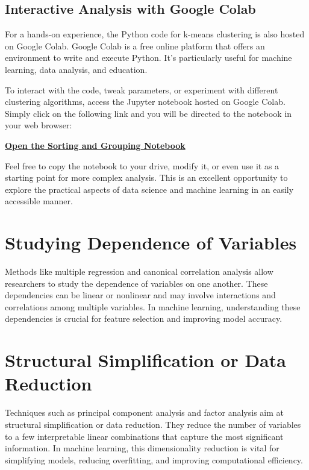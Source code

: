 \documentclass[a4paper,12pt]{book}
\begin{document}
\subsection{Interactive Analysis with Google Colab}
For a hands-on experience, the Python code for k-means clustering is also hosted on Google Colab. Google Colab is a free online platform that offers an environment to write and execute Python. It's particularly useful for machine learning, data analysis, and education.

To interact with the code, tweak parameters, or experiment with different clustering algorithms, access the Jupyter notebook hosted on Google Colab. Simply click on the following link and you will be directed to the notebook in your web browser:

\begin{center}
\href{https://colab.research.google.com/drive/1C4Rnja-fjwVB6GI5h1vYItJ5fbxDHlxh}{\textbf{Open the Sorting and Grouping Notebook}}
\end{center}

Feel free to copy the notebook to your drive, modify it, or even use it as a starting point for more complex analysis. This is an excellent opportunity to explore the practical aspects of data science and machine learning in an easily accessible manner.

\section{Studying Dependence of Variables}
Methods like multiple regression and canonical correlation analysis allow researchers to study the dependence of variables on one another. These dependencies can be linear or nonlinear and may involve interactions and correlations among multiple variables. In machine learning, understanding these dependencies is crucial for feature selection and improving model accuracy.

\section{Structural Simplification or Data Reduction}
Techniques such as principal component analysis and factor analysis aim at structural simplification or data reduction. They reduce the number of variables to a few interpretable linear combinations that capture the most significant information. In machine learning, this dimensionality reduction is vital for simplifying models, reducing overfitting, and improving computational efficiency.
\end{document}
